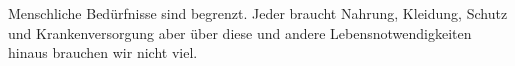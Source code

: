 Menschliche Bedürfnisse sind begrenzt.
Jeder braucht Nahrung, Kleidung, Schutz und Krankenversorgung aber über diese und andere Lebensnotwendigkeiten hinaus brauchen wir nicht viel.